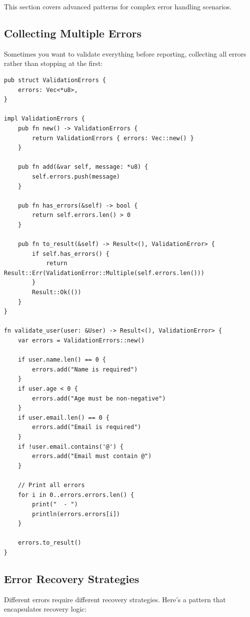 This section covers advanced patterns for complex error handling scenarios.

\subsection{Collecting Multiple Errors}

Sometimes you want to validate everything before reporting, collecting all errors rather than stopping at the first:

\begin{lstlisting}
pub struct ValidationErrors {
    errors: Vec<*u8>,
}

impl ValidationErrors {
    pub fn new() -> ValidationErrors {
        return ValidationErrors { errors: Vec::new() }
    }

    pub fn add(&var self, message: *u8) {
        self.errors.push(message)
    }

    pub fn has_errors(&self) -> bool {
        return self.errors.len() > 0
    }

    pub fn to_result(&self) -> Result<(), ValidationError> {
        if self.has_errors() {
            return Result::Err(ValidationError::Multiple(self.errors.len()))
        }
        Result::Ok(())
    }
}

fn validate_user(user: &User) -> Result<(), ValidationError> {
    var errors = ValidationErrors::new()

    if user.name.len() == 0 {
        errors.add("Name is required")
    }
    if user.age < 0 {
        errors.add("Age must be non-negative")
    }
    if user.email.len() == 0 {
        errors.add("Email is required")
    }
    if !user.email.contains('@') {
        errors.add("Email must contain @")
    }

    // Print all errors
    for i in 0..errors.errors.len() {
        print("  - ")
        println(errors.errors[i])
    }

    errors.to_result()
}
\end{lstlisting}

\subsection{Error Recovery Strategies}

Different errors require different recovery strategies. Here's a pattern that encapsulates recovery logic:

